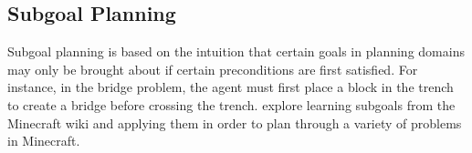 \documentclass[]{article}
\begin{document}





\subsection{Subgoal Planning}
\label{sec:subgoals}

Subgoal planning is based on the intuition that certain goals in
planning domains may only be brought about if certain preconditions
are first satisfied. For instance, in the bridge problem, the agent must
first place a block in the trench to create a bridge before crossing
the trench.  \citet{branavan12a} explore learning subgoals from the
Minecraft wiki and applying them in order to plan through a variety of
problems in Minecraft.
\end{document}
